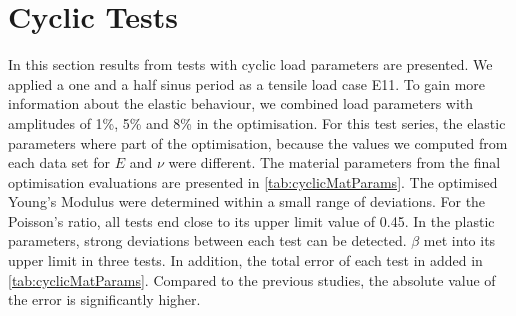 






\section{Cyclic Tests} \label{sec:cyclicTests}
In this section results from tests with cyclic load parameters are presented. We applied a one and a half sinus period as a tensile load case E11. To gain more information about the elastic behaviour, we combined load parameters with amplitudes of 1\%, 5\% and 8\% in the optimisation. For this test series, the elastic parameters where part of the optimisation, because the values we computed from each data set for $E$ and $\nu$ were different. The material parameters from the final optimisation evaluations are presented in \autoref{tab:cyclicMatParams}. The optimised Young's Modulus were determined within a small range of deviations. For the Poisson's ratio, all tests end close to its upper limit value of 0.45. In the plastic parameters, strong deviations between each test can be detected. $\beta$ met into its upper limit in three tests. In addition, the total error of each test in added in \autoref{tab:cyclicMatParams}. Compared to the previous studies, the absolute value of the error is significantly higher. 

